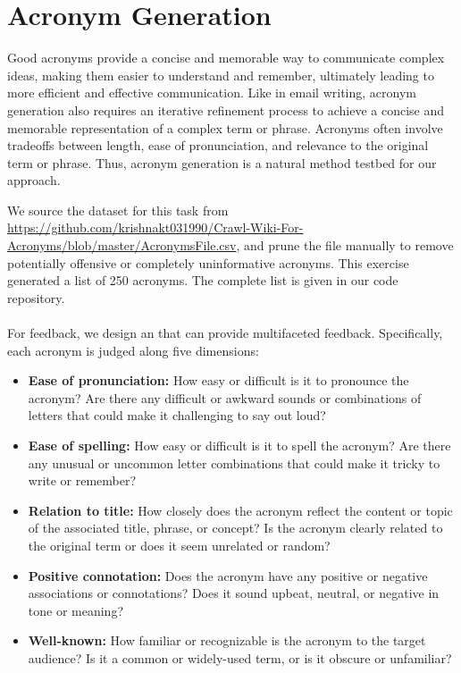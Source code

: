 \section{Acronym Generation}\label{section:acronym}

Good acronyms provide a concise and memorable way to communicate complex ideas, making them easier to understand and remember, ultimately leading to more efficient and effective communication.
Like in email writing, acronym generation also requires an iterative refinement process to achieve a concise and memorable representation of a complex term or phrase. 
Acronyms often involve tradeoffs between length, ease of pronunciation, and relevance to the original term or phrase.
Thus, acronym generation is a natural method testbed for our approach.

We source the dataset for this task from \url{https://github.com/krishnakt031990/Crawl-Wiki-For-Acronyms/blob/master/AcronymsFile.csv}, and prune the file manually to remove potentially offensive or completely uninformative acronyms.
This exercise generated a list of 250 acronyms.
The complete list is given in our code repository.


\paragraph{\fbmod} For feedback, we design an \fbmod that can provide multifaceted feedback. Specifically, each acronym is judged along five dimensions:
\begin{itemize}
\item \textbf{Ease of pronunciation:} How easy or difficult is it to pronounce the acronym? Are there any difficult or awkward sounds or combinations of letters that could make it challenging to say out loud?
\item \textbf{Ease of spelling:} How easy or difficult is it to spell the acronym? Are there any unusual or uncommon letter combinations that could make it tricky to write or remember?
\item \textbf{Relation to title:} How closely does the acronym reflect the content or topic of the associated title, phrase, or concept? Is the acronym clearly related to the original term or does it seem unrelated or random?
\item \textbf{Positive connotation:} Does the acronym have any positive or negative associations or connotations? Does it sound upbeat, neutral, or negative in tone or meaning?
\item \textbf{Well-known:} How familiar or recognizable is the acronym to the target audience? Is it a common or widely-used term, or is it obscure or unfamiliar?
\end{itemize}

